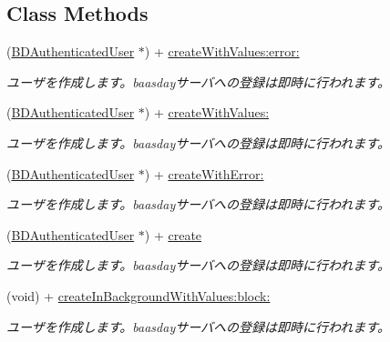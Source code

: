 \subsection*{Class Methods}
\begin{DoxyCompactItemize}
\item 
(\hyperlink{interface_b_d_authenticated_user}{B\-D\-Authenticated\-User} $\ast$) + \hyperlink{interface_b_d_authenticated_user_a60810e84160eeb3c547db67de582db60}{create\-With\-Values\-:error\-:}
\begin{DoxyCompactList}\small\item\em ユーザを作成します。baasdayサーバへの登録は即時に行われます。 \end{DoxyCompactList}\item 
(\hyperlink{interface_b_d_authenticated_user}{B\-D\-Authenticated\-User} $\ast$) + \hyperlink{interface_b_d_authenticated_user_a8fbfc9e494874aa7b49ccf81f82addfc}{create\-With\-Values\-:}
\begin{DoxyCompactList}\small\item\em ユーザを作成します。baasdayサーバへの登録は即時に行われます。 \end{DoxyCompactList}\item 
(\hyperlink{interface_b_d_authenticated_user}{B\-D\-Authenticated\-User} $\ast$) + \hyperlink{interface_b_d_authenticated_user_a632dce13be1bb28c0e200d515411aa39}{create\-With\-Error\-:}
\begin{DoxyCompactList}\small\item\em ユーザを作成します。baasdayサーバへの登録は即時に行われます。 \end{DoxyCompactList}\item 
(\hyperlink{interface_b_d_authenticated_user}{B\-D\-Authenticated\-User} $\ast$) + \hyperlink{interface_b_d_authenticated_user_a180aaa05728e33efacf4ca28484302f0}{create}
\begin{DoxyCompactList}\small\item\em ユーザを作成します。baasdayサーバへの登録は即時に行われます。 \end{DoxyCompactList}\item 
(void) + \hyperlink{interface_b_d_authenticated_user_a1ef5387cf8e1ae296bc9604c786e79f6}{create\-In\-Background\-With\-Values\-:block\-:}
\begin{DoxyCompactList}\small\item\em ユーザを作成します。baasdayサーバへの登録は即時に行われます。 \end{DoxyCompactList}\item 

\end{DoxyCompactItemize}

